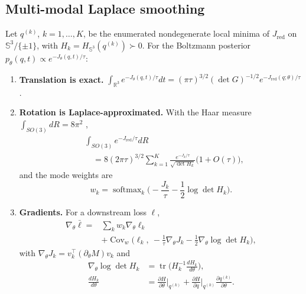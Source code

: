 \subsection{Multi-modal Laplace smoothing}\label{sec:laplace}

\begin{theorem}\label{thm:laplace}
Let $q^{(k)}$, $k=1,\dots,K$, be the enumerated nondegenerate local minima of $J_{\mathrm{red}}$ on $\mathbb{S}^3/\{\pm1\}$, with $H_k=H_{\mathbb{S}^3}(q^{(k)})\succ0$. For the Boltzmann posterior $p_\theta(q,t)\propto e^{-J_\theta(q,t)/\tau}$:
\begin{enumerate}
\item \textbf{Translation is exact.} $\int_{\mathbb{R}^3}e^{-J_\theta(q,t)/\tau}dt=(\pi\tau)^{3/2}(\det G)^{-1/2}e^{-J_{\mathrm{red}}(q;\theta)/\tau}$.
\item \textbf{Rotation is Laplace-approximated.} With the Haar measure $\int_{SO(3)}dR=8\pi^2$ \cite{chirikjian2012},
\begin{equation}
\begin{split}
&\int_{SO(3)}e^{-J_{\mathrm{red}}/\tau}dR\\
&\quad=8(2\pi\tau)^{3/2}\sum_{k=1}^K\frac{e^{-J_k/\tau}}{\sqrt{\det H_k}}\big(1+O(\tau)\big),
\end{split}
\label{eq:rotationint}
\end{equation}
and the mode weights are
\begin{equation}
w_k=\operatorname{softmax}_k\Big(-\frac{J_k}{\tau}-\frac12\log\det H_k\Big).
\label{eq:weights}
\end{equation}
\item \textbf{Gradients.} For a downstream loss $\ell$,
\begin{equation}
\begin{split}
\nabla_\theta\bar\ell={}&\sum_kw_k\nabla_\theta\ell_k\\
&+\operatorname{Cov}_w\Big(\ell_k,\ -\frac1\tau\nabla_\theta J_k-\frac12\nabla_\theta\log\det H_k\Big),
\end{split}
\label{eq:smgrad}
\end{equation}
with $\nabla_\theta J_k=v_k^\top(\partial_\theta M)v_k$ and
\begin{equation}
\begin{split}
\nabla_\theta\log\det H_k&=\operatorname{tr}\Big(H_k^{-1}\frac{dH_k}{d\theta}\Big),\\
\frac{dH_k}{d\theta}&=\frac{\partial H}{\partial\theta}\Big|_{q^{(k)}}+\frac{\partial H}{\partial q}\Big|_{q^{(k)}}\frac{\partial q^{(k)}}{\partial\theta}.

\end{split}
\end{equation}
\end{enumerate}
\end{theorem}
